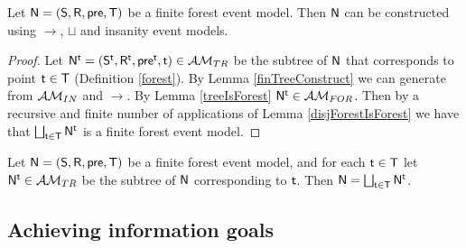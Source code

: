 \begin{lemma} \label{forestCon}
Let $\evM = (\evS, \evR, \evpr, \evT)$ be a finite forest event model.
Then $\evM$ can be constructed using $\to$, $\sqcup$ and insanity event models.
\end{lemma}

\begin{proof}
Let $\evM^\evt = (\evS^\evt, \evR^\evt, \evpr^\evt, \evt) \in \treeClass$ be the
subtree of $\evM$ that corresponds to point $\evt \in \evT$ (Definition \ref{forest}).
By Lemma \ref{finTreeConstruct} we can generate from $\insaneClass$ and $\to$.
By Lemma \ref{treeIsForest} $\evM^\evt \in \forestClass$.
Then by a recursive and finite number of applications of Lemma
\ref{disjForestIsForest} we have that $\bigsqcup_{\evt \in \evT} \evM^\evt$ is a finite
forest event model.
\end{proof}

\begin{corr} \label{forestConCorr}
Let $\evM = (\evS, \evR, \evpr, \evT)$ be a finite forest event model, and for each $\evt \in \evT$ let $\evM^\evt \in
\treeClass$ be the subtree of $\evM$ corresponding to $\evt$.
Then $\evM = \bigsqcup_{\evt \in \evT} \evM^\evt$.
\end{corr}

\subsection{Achieving information goals}


